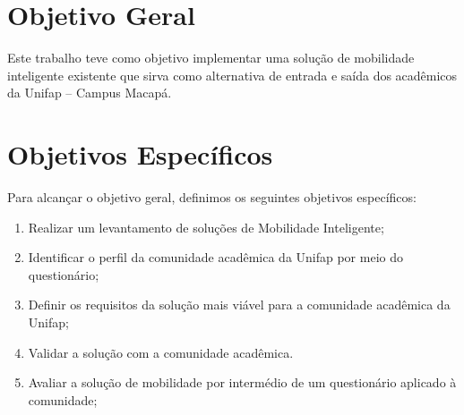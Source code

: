 \begin{comment}
que os problemas de mobilidade existentes
atualmente em Macapá atingem diretamente a comunidade acadêmica da Universidade Federal do Amapá, este trabalho buscará entender o perfil e as principais dificuldades da comunidade acadêmica, e, a partir de um estudo de soluções existentes no contexto de CI para propor uma solução que seja viável e admissível para a comunidade acadêmica da Unifap

%
\end{comment}

\section {Objetivo Geral}

Este trabalho teve como objetivo implementar uma solução de mobilidade inteligente existente que sirva como alternativa de entrada e saída dos acadêmicos da Unifap -- Campus Macapá.

\section{Objetivos Específicos}

Para alcançar o objetivo geral, definimos os seguintes objetivos específicos:

\begin{enumerate}

\item Realizar um levantamento de soluções de Mobilidade Inteligente;

\item Identificar o perfil da comunidade acadêmica da Unifap por meio do questionário; %

\item Definir os requisitos da solução mais viável para a comunidade acadêmica da Unifap;

\item Validar a solução com a comunidade acadêmica.

\item Avaliar a solução de mobilidade por intermédio de um questionário aplicado à comunidade;

\end{enumerate}

